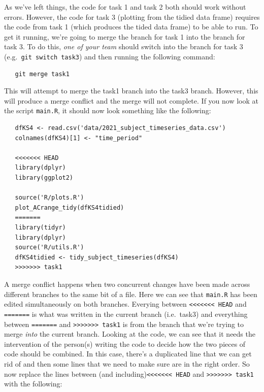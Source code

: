 \documentclass[
  12pt,
]{article}
\begin{document}
As we've left things, the code for task 1 and task 2 both should work
without errors. However, the code for task 3 (plotting from the tidied
data frame) requires the code from task 1 (which produces the tided data
frame) to be able to run. To get it running, we're going to merge the
branch for task 1 into the branch for task 3. To do this, \emph{one of
your team} should switch into the branch for task 3
(e.g.~\texttt{git\ switch\ task3}) and then running the following
command:

\begin{verbatim}
   git merge task1
\end{verbatim}

This will attempt to merge the task1 branch into the task3 branch.
However, this will produce a merge conflict and the merge will not
complete. If you now look at the script \texttt{main.R}, it should now
look something like the following:

\begin{verbatim}
   dfKS4 <- read.csv('data/2021_subject_timeseries_data.csv')
   colnames(dfKS4)[1] <- "time_period"

   <<<<<<< HEAD
   library(dplyr)
   library(ggplot2)

   source('R/plots.R')
   plot_ACrange_tidy(dfKS4tidied)
   =======
   library(tidyr)
   library(dplyr)
   source('R/utils.R')
   dfKS4tidied <- tidy_subject_timeseries(dfKS4)
   >>>>>>> task1
\end{verbatim}

A merge conflict happens when two concurrent changes have been made
across different branches to the same bit of a file. Here we can see
that \texttt{main.R} has been edited simultaneously on both branches.
Everying between
\texttt{\textless{}\textless{}\textless{}\textless{}\textless{}\textless{}\textless{}\ HEAD}
and \texttt{=======} is what was written in the current branch
(i.e.~task3) and everything between \texttt{=======} and
\texttt{\textgreater{}\textgreater{}\textgreater{}\textgreater{}\textgreater{}\textgreater{}\textgreater{}\ task1}
is from the branch that we're trying to merge \emph{into} the current
branch. Looking at the code, we can see that it needs the intervention
of the person(s) writing the code to decide how the two pieces of code
should be combined. In this case, there's a duplicated line that we can
get rid of and then some lines that we need to make sure are in the
right order. So now replace the lines between (and
including)\texttt{\textless{}\textless{}\textless{}\textless{}\textless{}\textless{}\textless{}\ HEAD}
and
\texttt{\textgreater{}\textgreater{}\textgreater{}\textgreater{}\textgreater{}\textgreater{}\textgreater{}\ task1}
with the following:
\end{document}
